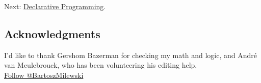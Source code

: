 Next:
\href{https://bartoszmilewski.com/2015/04/15/category-theory-and-declarative-programming/}{Declarative
Programming}.

\subsection{Acknowledgments}\label{acknowledgments}

I'd like to thank Gershom Bazerman for checking my math and logic, and
André van Meulebrouck, who has been volunteering his editing help.\\
\href{https://twitter.com/BartoszMilewski}{Follow @BartoszMilewski}
